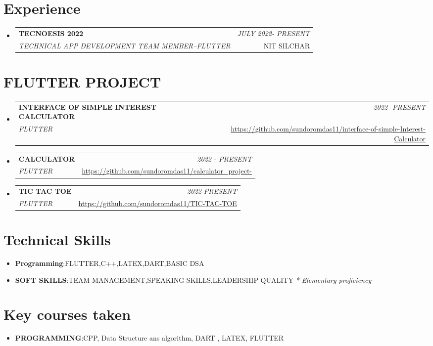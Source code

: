 \documentclass[a4paper,11pt]{article}
\makeatletter
\newcommand{\resumeItem}[2]{
  \item{
    \textbf{#1}{:\hspace{0.5mm}#2 \vspace{-0.5mm}}
  }
}
\newcommand{\resumeSubheading}[4]{
\vspace{0.5mm}\item
    \begin{tabular*}{0.98\textwidth}[t]{l@{\extracolsep{\fill}}r}
        \textbf{#1} & \textit{\footnotesize{#4}} \\
        \textit{\footnotesize{#3}} &  \footnotesize{#2}\\
    \end{tabular*}
    \vspace{-2.4mm}
}
\newcommand{\resumeProject}[4]{
\vspace{0.5mm}\item
    \begin{tabular*}{0.98\textwidth}[t]{l@{\extracolsep{\fill}}r}
        \textbf{#1} & \textit{\footnotesize{#3}} \\
        \footnotesize{\textit{#2}} & \footnotesize{#4}
    \end{tabular*}
    \vspace{-2.4mm}
}
\newcommand{\resumeSubItem}[2]{\resumeItem{#1}{#2}\vspace{-4pt}}
\newcommand{\resumeSubHeadingListStart}{\begin{itemize}[leftmargin=*,labelsep=0mm]}
\newcommand{\resumeHeadingSkillStart}{\begin{itemize}[leftmargin=*,itemsep=1.7mm, rightmargin=2ex]}
\newcommand{\resumeItemListStart}{\begin{justify}\begin{itemize}[leftmargin=3ex, rightmargin=2ex, noitemsep,labelsep=1.2mm,itemsep=0mm]\small}
\newcommand{\resumeSubHeadingListEnd}{\end{itemize}\vspace{2mm}}
\newcommand{\resumeHeadingSkillEnd}{\end{itemize}\vspace{-2mm}}
\newcommand{\resumeItemListEnd}{\end{itemize}\end{justify}\vspace{-2mm}}
\makeatother
\begin{document}
\section{Experience}
  \resumeSubHeadingListStart

    \resumeSubheading
      {TECNOESIS 2022}{NIT SILCHAR}
      {TECHNICAL APP DEVELOPMENT TEAM MEMBER--FLUTTER }{JULY 2022- PRESENT}
  \resumeSubHeadingListEnd
\vspace{-5.5mm}
\section{FLUTTER PROJECT}
\resumeSubHeadingListStart
    
    \resumeProject
      {INTERFACE OF SIMPLE INTEREST CALCULATOR} %
      {FLUTTER} %
      {2022- PRESENT} %
      {\href{https://github.com/sundoromdas11/interface-of-simple-Interest-Calculator}{https://github.com/sundoromdas11/interface-of-simple-Interest-Calculator}} %
    \resumeProject
    {CALCULATOR}
    {FLUTTER}{2022 - PRESENT}{\href{https://github.com/sundoromdas11/calculator_project-}{https://github.com/sundoromdas11/calculator_project-}}
    \resumeProject
    {TIC TAC TOE}
    {FLUTTER}{2022-PRESENT}{\href{https://github.com/sundoromdas11/TIC-TAC-TOE}{https://github.com/sundoromdas11/TIC-TAC-TOE}}
      
  \resumeSubHeadingListEnd
\vspace{-5.5mm}


\section{Technical Skills}
 \resumeHeadingSkillStart
  \resumeSubItem{Programming} %
    {FLUTTER,C++,LATEX,DART,BASIC DSA}
 \resumeSubItem{SOFT SKILLS} %
    {TEAM MANAGEMENT,SPEAKING SKILLS,LEADERSHIP QUALITY} %
\hfill \textit{\footnotesize{* Elementary proficiency}} \hspace{3mm}
 \resumeHeadingSkillEnd


\section{Key courses taken}
\resumeHeadingSkillStart
 \resumeSubItem{PROGRAMMING} %
    {CPP,  Data Structure ans algorithm, DART , LATEX, FLUTTER }
 \resumeHeadingSkillEnd
\end{document}
